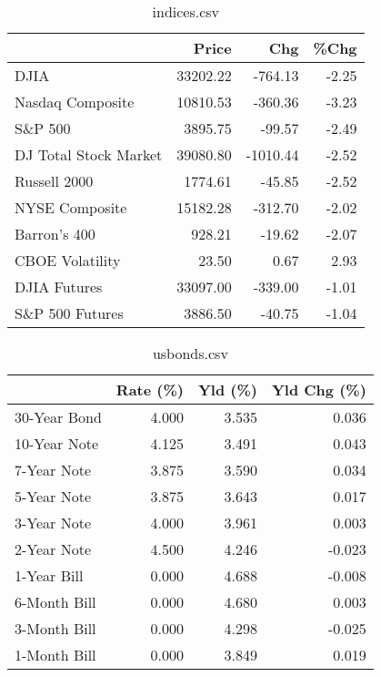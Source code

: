 \documentclass{article}%
\begin{document}
%


\begin{table}[htbp]%
\caption{indices.csv}%
\centering%
\begin{adjustbox}{width=1\textwidth}%
\begin{tabular}{lrrr}
\toprule
                      &    Price &      Chg &  \%Chg \\
\midrule
                 DJIA & 33202.22 &  -764.13 & -2.25 \\
     Nasdaq Composite & 10810.53 &  -360.36 & -3.23 \\
              S\&P 500 &  3895.75 &   -99.57 & -2.49 \\
DJ Total Stock Market & 39080.80 & -1010.44 & -2.52 \\
         Russell 2000 &  1774.61 &   -45.85 & -2.52 \\
       NYSE Composite & 15182.28 &  -312.70 & -2.02 \\
         Barron's 400 &   928.21 &   -19.62 & -2.07 \\
      CBOE Volatility &    23.50 &     0.67 &  2.93 \\
         DJIA Futures & 33097.00 &  -339.00 & -1.01 \\
      S\&P 500 Futures &  3886.50 &   -40.75 & -1.04 \\
\bottomrule
\end{tabular}
%
\end{adjustbox}%
\end{table}

%


\begin{table}[htbp]%
\caption{usbonds.csv}%
\centering%
\begin{adjustbox}{width=1\textwidth}%
\begin{tabular}{lrrr}
\toprule
             &  Rate (\%) &  Yld (\%) &  Yld Chg (\%) \\
\midrule
30-Year Bond &     4.000 &    3.535 &        0.036 \\
10-Year Note &     4.125 &    3.491 &        0.043 \\
 7-Year Note &     3.875 &    3.590 &        0.034 \\
 5-Year Note &     3.875 &    3.643 &        0.017 \\
 3-Year Note &     4.000 &    3.961 &        0.003 \\
 2-Year Note &     4.500 &    4.246 &       -0.023 \\
 1-Year Bill &     0.000 &    4.688 &       -0.008 \\
6-Month Bill &     0.000 &    4.680 &        0.003 \\
3-Month Bill &     0.000 &    4.298 &       -0.025 \\
1-Month Bill &     0.000 &    3.849 &        0.019 \\
\bottomrule
\end{tabular}
%
\end{adjustbox}%
\end{table}
\end{document}
